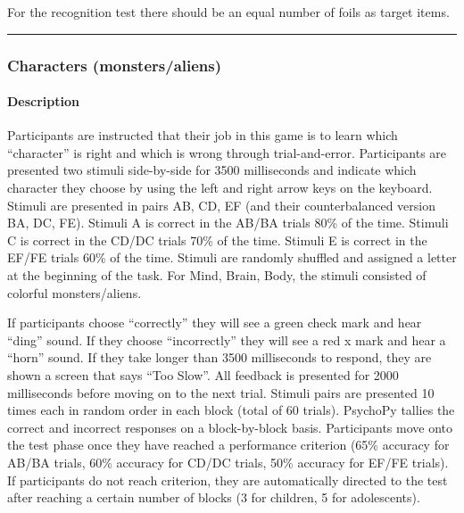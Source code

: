 \documentclass[]{book}
\let\oldparagraph\paragraph
\renewcommand{\paragraph}[1]{\oldparagraph{#1}\mbox{}}
\begin{document}
For the recognition test there should be an equal number of foils as target items.

\begin{center}\rule{0.5\linewidth}{0.5pt}\end{center}

\hypertarget{characters-monstersaliens}{%
\subsubsection{Characters (monsters/aliens)}\label{characters-monstersaliens}}

\hypertarget{description-3}{%
\paragraph{Description}\label{description-3}}

Participants are instructed that their job in this game is to learn which ``character'' is right and which is wrong through trial-and-error. Participants are presented two stimuli side-by-side for 3500 milliseconds and indicate which character they choose by using the left and right arrow keys on the keyboard. Stimuli are presented in pairs AB, CD, EF (and their counterbalanced version BA, DC, FE). Stimuli A is correct in the AB/BA trials 80\% of the time. Stimuli C is correct in the CD/DC trials 70\% of the time. Stimuli E is correct in the EF/FE trials 60\% of the time. Stimuli are randomly shuffled and assigned a letter at the beginning of the task. For Mind, Brain, Body, the stimuli consisted of colorful monsters/aliens.

If participants choose ``correctly'' they will see a green check mark and hear ``ding'' sound. If they choose ``incorrectly'' they will see a red x mark and hear a ``horn'' sound. If they take longer than 3500 milliseconds to respond, they are shown a screen that says ``Too Slow''. All feedback is presented for 2000 milliseconds before moving on to the next trial. Stimuli pairs are presented 10 times each in random order in each block (total of 60 trials). PsychoPy tallies the correct and incorrect responses on a block-by-block basis. Participants move onto the test phase once they have reached a performance criterion (65\% accuracy for AB/BA trials, 60\% accuracy for CD/DC trials, 50\% accuracy for EF/FE trials). If participants do not reach criterion, they are automatically directed to the test after reaching a certain number of blocks (3 for children, 5 for adolescents).
\end{document}
